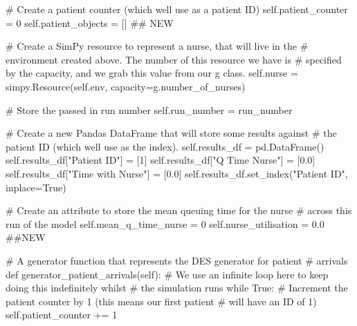 \documentclass[
  letterpaper,
  DIV=11,
  numbers=noendperiod]{scrreprt}
\newenvironment{Shaded}{\begin{snugshade}}{\end{snugshade}}
\newcommand{\CommentTok}[1]{\textcolor[rgb]{0.37,0.37,0.37}{#1}}
\newcommand{\ControlFlowTok}[1]{\textcolor[rgb]{0.00,0.23,0.31}{#1}}
\newcommand{\DecValTok}[1]{\textcolor[rgb]{0.68,0.00,0.00}{#1}}
\newcommand{\FloatTok}[1]{\textcolor[rgb]{0.68,0.00,0.00}{#1}}
\newcommand{\KeywordTok}[1]{\textcolor[rgb]{0.00,0.23,0.31}{#1}}
\newcommand{\NormalTok}[1]{\textcolor[rgb]{0.00,0.23,0.31}{#1}}
\newcommand{\OperatorTok}[1]{\textcolor[rgb]{0.37,0.37,0.37}{#1}}
\newcommand{\StringTok}[1]{\textcolor[rgb]{0.13,0.47,0.30}{#1}}
\newcommand{\VariableTok}[1]{\textcolor[rgb]{0.07,0.07,0.07}{#1}}
\begin{document}
\begin{tcolorbox}
\begin{Shaded}
\begin{Highlighting}[]
        \CommentTok{\# Create a patient counter (which we\textquotesingle{}ll use as a patient ID)}
        \VariableTok{self}\NormalTok{.patient\_counter }\OperatorTok{=} \DecValTok{0}
        \VariableTok{self}\NormalTok{.patient\_objects }\OperatorTok{=}\NormalTok{ [] }\CommentTok{\#\# NEW}

        \CommentTok{\# Create a SimPy resource to represent a nurse, that will live in the}
        \CommentTok{\# environment created above.  The number of this resource we have is}
        \CommentTok{\# specified by the capacity, and we grab this value from our g class.}
        \VariableTok{self}\NormalTok{.nurse }\OperatorTok{=}\NormalTok{ simpy.Resource(}\VariableTok{self}\NormalTok{.env, capacity}\OperatorTok{=}\NormalTok{g.number\_of\_nurses)}

        \CommentTok{\# Store the passed in run number}
        \VariableTok{self}\NormalTok{.run\_number }\OperatorTok{=}\NormalTok{ run\_number}

        \CommentTok{\# Create a new Pandas DataFrame that will store some results against}
        \CommentTok{\# the patient ID (which we\textquotesingle{}ll use as the index).}
        \VariableTok{self}\NormalTok{.results\_df }\OperatorTok{=}\NormalTok{ pd.DataFrame()}
        \VariableTok{self}\NormalTok{.results\_df[}\StringTok{"Patient ID"}\NormalTok{] }\OperatorTok{=}\NormalTok{ [}\DecValTok{1}\NormalTok{]}
        \VariableTok{self}\NormalTok{.results\_df[}\StringTok{"Q Time Nurse"}\NormalTok{] }\OperatorTok{=}\NormalTok{ [}\FloatTok{0.0}\NormalTok{]}
        \VariableTok{self}\NormalTok{.results\_df[}\StringTok{"Time with Nurse"}\NormalTok{] }\OperatorTok{=}\NormalTok{ [}\FloatTok{0.0}\NormalTok{]}
        \VariableTok{self}\NormalTok{.results\_df.set\_index(}\StringTok{"Patient ID"}\NormalTok{, inplace}\OperatorTok{=}\VariableTok{True}\NormalTok{)}

        \CommentTok{\# Create an attribute to store the mean queuing time for the nurse}
        \CommentTok{\# across this run of the model}
        \VariableTok{self}\NormalTok{.mean\_q\_time\_nurse }\OperatorTok{=} \DecValTok{0}
        \VariableTok{self}\NormalTok{.nurse\_utilisation }\OperatorTok{=} \FloatTok{0.0} \CommentTok{\#\#NEW}

    \CommentTok{\# A generator function that represents the DES generator for patient}
    \CommentTok{\# arrivals}
    \KeywordTok{def}\NormalTok{ generator\_patient\_arrivals(}\VariableTok{self}\NormalTok{):}
        \CommentTok{\# We use an infinite loop here to keep doing this indefinitely whilst}
        \CommentTok{\# the simulation runs}
        \ControlFlowTok{while} \VariableTok{True}\NormalTok{:}
            \CommentTok{\# Increment the patient counter by 1 (this means our first patient}
            \CommentTok{\# will have an ID of 1)}
            \VariableTok{self}\NormalTok{.patient\_counter }\OperatorTok{+=} \DecValTok{1}


\end{Highlighting}
\end{Shaded}
\end{tcolorbox}
\end{document}
